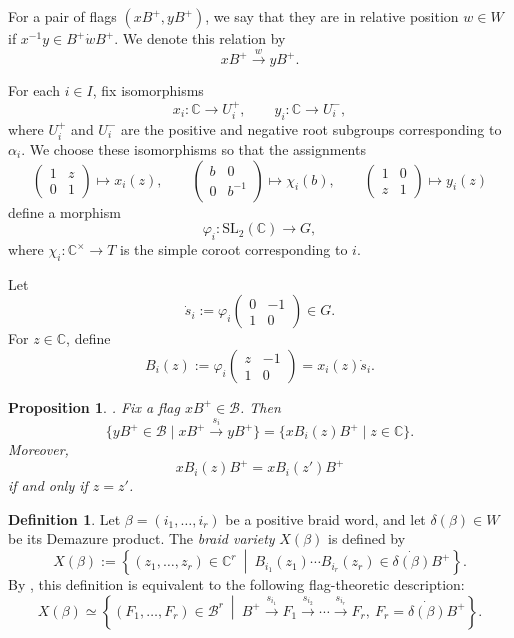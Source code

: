 \documentclass[12pt, reqno]{amsart}
\theoremstyle{plain}
\newtheorem{proposition}[theorem]{Proposition}
\theoremstyle{definition}
\newtheorem{definition}[theorem]{Definition}
\numberwithin{equation}{section}
\begin{document}
For a pair of flags \((xB^+,yB^+)\), we say that they are in relative position
\(w\in W\) if
\(x^{-1}y\in B^+\dot wB^+.
\)
We denote this relation by
\[
xB^+\xrightarrow{w} yB^+ .
\]

For each \(i\in I\), fix isomorphisms
\[
x_i:\mathbb C\to U_i^+,
\qquad
y_i:\mathbb C\to U_i^-,
\]
where \(U_i^+\) and \(U_i^-\) are the positive and negative root subgroups
corresponding to \(\alpha_i\). We choose these isomorphisms so that the assignments
\[
\begin{pmatrix}
1 & z \\ 0 & 1
\end{pmatrix}
\mapsto x_i(z),
\qquad
\begin{pmatrix}
b & 0 \\ 0 & b^{-1}
\end{pmatrix}
\mapsto \chi_i(b),
\qquad
\begin{pmatrix}
1 & 0 \\ z & 1
\end{pmatrix}
\mapsto y_i(z)
\]
define a morphism
\[
\varphi_i:\mathrm{SL}_2(\mathbb C)\to G,
\]
where \(\chi_i:\mathbb C^\times\to T\) is the simple coroot corresponding to
\(i\).

Let
\[
\dot s_i:=
\varphi_i
\begin{pmatrix}
0 & -1 \\ 1 & 0
\end{pmatrix}
\in G .
\]
For \(z\in\mathbb C\), define
\begin{equation}\label{eq:Biz}
B_i(z)
:=
\varphi_i
\begin{pmatrix}
z & -1 \\ 1 & 0
\end{pmatrix}
=
x_i(z)\dot s_i .
\end{equation}

\begin{proposition}
\label{pro:Biz}
{\rm \cite[Proposition~3.6]{casals2025cluster}.}
Fix a flag \(xB^+\in\mathcal B\). Then
\[
\{yB^+\in\mathcal B\mid xB^+\xrightarrow{s_i}yB^+\}
=
\{xB_i(z)B^+\mid z\in\mathbb C\}.
\]
Moreover,
\[
xB_i(z)B^+=xB_i(z')B^+
\]
if and only if \(z=z'\).
\end{proposition}

\begin{definition}
Let \(\beta=(i_1,\dots,i_r)\) be a positive braid word, and let
\(\delta(\beta)\in W\) be its Demazure product. The \emph{braid variety}
\(X(\beta)\) is defined by
\[
X(\beta)
:=
\left\{
(z_1,\dots,z_r)\in\mathbb C^r
\ \middle|\
B_{i_1}(z_1)\cdots B_{i_r}(z_r)
\in
\dot{\delta(\beta)}B^+
\right\}.
\]
By \cite[Corollary~3.7]{casals2025cluster}, this definition is equivalent to
the following flag-theoretic description:
\[
X(\beta)
\simeq
\left\{
(F_1,\dots,F_r)\in\mathcal B^r
\ \middle|\
B^+\xrightarrow{s_{i_1}}F_1
\xrightarrow{s_{i_2}}\cdots
\xrightarrow{s_{i_r}}F_r,\ 
F_r=\dot{\delta(\beta)}B^+
\right\}.
\]
\end{definition}
\end{document}
